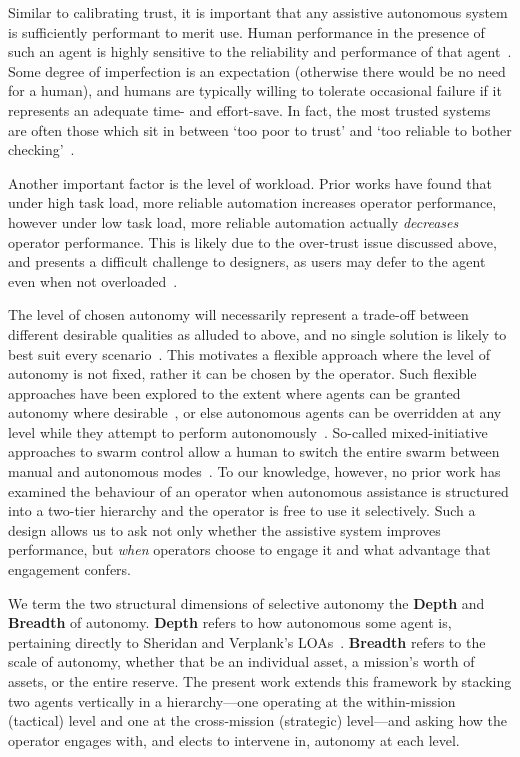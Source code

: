 \documentclass[10pt]{article}
\theoremstyle{definition}
\begin{document}
Similar to calibrating trust, it is important that any assistive autonomous system is sufficiently performant to merit use. Human performance in the presence of such an agent is highly sensitive to the reliability and performance of that agent~\cite{rovira_effects_2007}. Some degree of imperfection is an expectation (otherwise there would be no need for a human), and humans are typically willing to tolerate occasional failure if it represents an adequate time- and effort-save. In fact, the most trusted systems are often those which sit in between `too poor to trust' and `too reliable to bother checking'~\cite{kate2018trustworthiness}.

Another important factor is the level of workload. Prior works have found that under high task load, more reliable automation increases operator performance, however under low task load, more reliable automation actually \textit{decreases} operator performance. This is likely due to the over-trust issue discussed above, and presents a difficult challenge to designers, as users may defer to the agent even when not overloaded~\cite{parasuraman_adaptive_2009}.

The level of chosen autonomy will necessarily represent a trade-off between different desirable qualities as alluded to above, and no single solution is likely to best suit every scenario~\cite{miller_delegation_nodate}. This motivates a flexible approach where the level of autonomy is not fixed, rather it can be chosen by the operator. Such flexible approaches have been explored to the extent where agents can be granted autonomy where desirable~\cite{hardin_using_nodate}, or else autonomous agents can be overridden at any level while they attempt to perform autonomously~\cite{valero-gomez_impact_2011}. So-called mixed-initiative approaches to swarm control allow a human to switch the entire swarm between manual and autonomous modes~\cite{nam_trust_2018}. To our knowledge, however, no prior work has examined the behaviour of an operator when autonomous assistance is structured into a two-tier hierarchy and the operator is free to use it selectively. Such a design allows us to ask not only whether the assistive system improves performance, but \emph{when} operators choose to engage it and what advantage that engagement confers.

We term the two structural dimensions of selective autonomy the \textbf{Depth} and \textbf{Breadth} of autonomy. \textbf{Depth} refers to how autonomous some agent is, pertaining directly to Sheridan and Verplank's LOAs~\cite{sheridan1978human}. \textbf{Breadth} refers to the scale of autonomy, whether that be an individual asset, a mission's worth of assets, or the entire reserve. The present work extends this framework by stacking two agents vertically in a hierarchy---one operating at the within-mission (tactical) level and one at the cross-mission (strategic) level---and asking how the operator engages with, and elects to intervene in, autonomy at each level.
\end{document}
